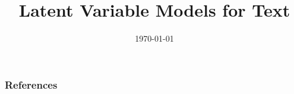 \documentclass{beamer}
\title[latent]{Latent Variable Models for Text}
\author[us]{\today}
\institute[Harvard SEAS]{ 
{ }


}
\date{}
\begin{document}
\begin{frame}
  \titlepage
\end{frame}

\begin{frame}
  \tableofcontents[hideallsubsections]
\end{frame}
%



\begin{frame}[allowframebreaks]
        \frametitle{References}
        {\tiny
        \printbibliography}
\end{frame}
\end{document}
